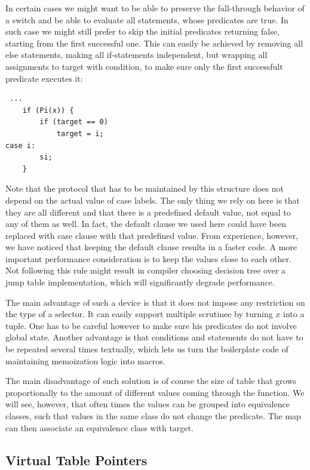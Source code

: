 \documentclass[preprint]{sigplanconf}
\begin{document}
In certain cases we might want to be able to preserve the fall-through behavior 
of a switch and be able to evaluate all statements, whose predicates are true. 
In such case we might still prefer to skip the initial predicates returning 
false, starting from the first successful one. This can easily be achieved by 
removing all else statements, making all if-statements independent, but wrapping 
all assignments to target with condition, to make sure only the first 
successfult predicate executes it:

\begin{lstlisting}
 ...
    if (Pi(x)) { 
        if (target == 0)
            target = i;
case i:
        si;
    }
\end{lstlisting}

Note that the protocol that has to be maintained by this structure does not 
depend on the actual value of case labels. The only thing we rely on here is 
that they are all different and that there is a predefined default value, not 
equal to any of them as well. In fact, the default clause we used here could 
have been replaced with case clause with that predefined value. From experience,
however, we have noticed that keeping the default clause results in a faster 
code. A more important performance consideration is to keep the values close to
each other. Not following this rule might result in compiler choosing decision 
tree over a jump table implementation, which will significantly degrade 
performance.

The main advantage of such a device is that it does not impose any restriction 
on the type of a selector. It can easily support multiple scrutinee by turning 
$x$ into a tuple. One has to be careful however to make sure his predicates do 
not involve global state. Another advantage is that conditions and statements 
do not have to be repeated several times textually, which lets us turn the 
boilerplate code of maintaining memoization logic into macros.

The main disadvantage of such solution is of course the size of table that grows 
proportionally to the amount of different values coming through the function. We 
will see, however, that often times the values can be grouped into equivalence 
classes, such that values in the same class do not change the predicate. The map 
can then associate an equivalence class with target.

\subsection{Virtual Table Pointers}
\end{document}

